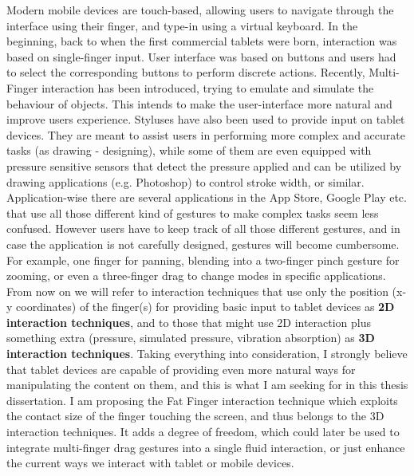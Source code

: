 Modern mobile devices are touch-based, allowing users to navigate through the interface using their finger, and type-in using a virtual keyboard. 
In the beginning, back to when the first commercial tablets were born, interaction was based on single-finger input. User interface was based on buttons and users had to select the corresponding buttons to perform discrete actions.
Recently, Multi-Finger interaction has been introduced, trying to emulate and simulate the behaviour of objects. This intends to make the user-interface more natural and improve users experience. 
Styluses have also been used to provide input on tablet devices. They are meant to assist users in performing more complex and accurate tasks (as drawing - designing), while some of them are even equipped with pressure sensitive sensors that detect the pressure applied and can be utilized by drawing applications (e.g. Photoshop) to control stroke width, or similar. 
Application-wise there are several applications in the App Store, Google Play etc. that use all those different kind of gestures to make complex tasks seem less confused. However users have to keep track of all those different gestures, and in case the application is not carefully designed, gestures will become cumbersome. For example, one finger for panning, blending into a two-finger pinch gesture for zooming, or even a three-finger drag to change modes in specific applications.  
From now on we will refer to interaction techniques that use only the position (x-y coordinates) of the finger(s) for providing basic input to tablet devices as \textbf{2D interaction techniques}, and to those that might use 2D interaction plus something extra (pressure, simulated pressure, vibration absorption) as \textbf{3D interaction techniques}.
Taking everything into consideration, I strongly believe that tablet devices are capable of providing even more natural ways for manipulating the content on them, and this is what I am seeking for in this thesis dissertation. I am proposing the Fat Finger interaction technique which exploits the contact size of the finger touching the screen, and thus belongs to the 3D interaction techniques. It adds a degree of freedom, which could later be used to integrate multi-finger drag gestures into a single fluid interaction, or just enhance the current ways we interact with tablet or mobile devices. 


